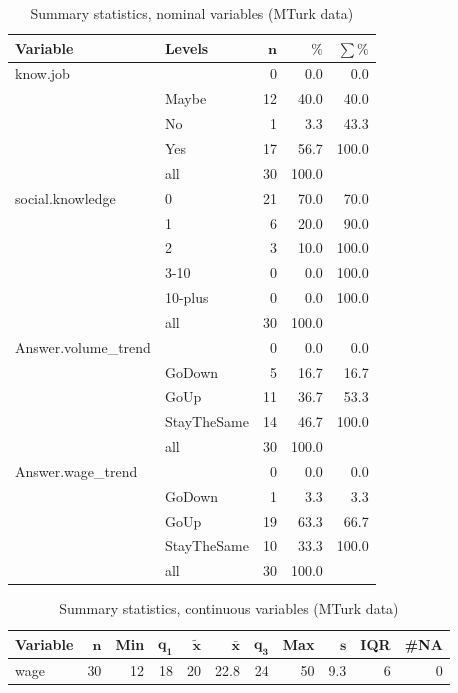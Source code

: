 \documentclass[a4paper,10pt]{article}\usepackage[]{graphicx}\usepackage[]{color}
\begin{document}
\begin{table}[ht]
\centering
{\footnotesize
\begin{tabular}{ll|rrr}
 \textbf{Variable} & \textbf{Levels} & $\mathbf{n}$ & $\mathbf{\%}$ & $\mathbf{\sum \%}$ \\ 
  \hline
know.job &  & 0 & 0.0 & 0.0 \\ 
   & Maybe & 12 & 40.0 & 40.0 \\ 
   & No & 1 & 3.3 & 43.3 \\ 
   & Yes & 17 & 56.7 & 100.0 \\ 
   \hline
 & all & 30 & 100.0 &  \\ 
   \hline
\hline
social.knowledge & 0 & 21 & 70.0 & 70.0 \\ 
   & 1 & 6 & 20.0 & 90.0 \\ 
   & 2 & 3 & 10.0 & 100.0 \\ 
   & 3-10 & 0 & 0.0 & 100.0 \\ 
   & 10-plus & 0 & 0.0 & 100.0 \\ 
   \hline
 & all & 30 & 100.0 &  \\ 
   \hline
\hline
Answer.volume\_trend &  & 0 & 0.0 & 0.0 \\ 
   & GoDown & 5 & 16.7 & 16.7 \\ 
   & GoUp & 11 & 36.7 & 53.3 \\ 
   & StayTheSame & 14 & 46.7 & 100.0 \\ 
   \hline
 & all & 30 & 100.0 &  \\ 
   \hline
\hline
Answer.wage\_trend &  & 0 & 0.0 & 0.0 \\ 
   & GoDown & 1 & 3.3 & 3.3 \\ 
   & GoUp & 19 & 63.3 & 66.7 \\ 
   & StayTheSame & 10 & 33.3 & 100.0 \\ 
   \hline
 & all & 30 & 100.0 &  \\ 
   \hline
\hline
\end{tabular}
}
\caption{Summary statistics, nominal variables (MTurk data)} 
\label{tab1:49-9040}
\end{table}
\begin{table}[ht]
\centering
{\footnotesize
\begin{tabular}{lrrrrrrrrrr}
 \textbf{Variable} & $\mathbf{n}$ & \textbf{Min} & $\mathbf{q_1}$ & $\mathbf{\widetilde{x}}$ & $\mathbf{\bar{x}}$ & $\mathbf{q_3}$ & \textbf{Max} & $\mathbf{s}$ & \textbf{IQR} & \textbf{\#NA} \\ 
  \hline
wage & 30 & 12 & 18 & 20 & 22.8 & 24 & 50 & 9.3 & 6 & 0 \\ 
  \end{tabular}
}
\caption{Summary statistics, continuous variables (MTurk data)} 
\label{tab2:49-9040}
\end{table}
\end{document}
